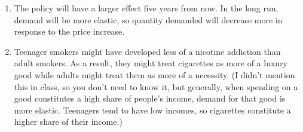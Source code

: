 \documentclass{article}
\begin{document}
\begin{enumerate}
\begin{enumerate}
		The government should increase the price by \$3.33.
		
	\item The policy will have a larger effect five years from now. In the long run, demand will be more elastic, so quantity demanded will decrease more in response to the price increase. 
	
	\item Teenager smokers might have developed less of a nicotine addiction than adult smokers. As a result, they might treat cigarettes as more of a luxury good while adults might treat them as more of a necessity. (I didn't mention this in class, so you don't need to know it, but generally, when spending on a good constitutes a high share of people's income, demand for that good is more elastic. Teenagers tend to have low incomes, so cigarettes constitute a higher share of their income.)
	
	\end{enumerate}


\end{enumerate}
\end{document}
